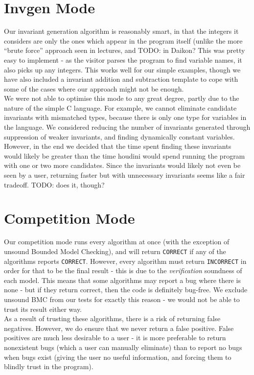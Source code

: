 \documentclass[11pt]{article}
\begin{document}
\section{Invgen Mode}

Our invariant generation algorithm is reasonably smart, in that the integers it considers are only the ones which appear in the program itself (unlike the more ``brute force'' approach seen in lectures, and TODO: in Daikon? This was pretty easy to implement - as the visitor parses the program to find variable names, it also picks up any integers. This works well for our simple examples, though we have also included a invariant addition and subtraction template to cope with some of the cases where our approach might not be enough. \\

We were not able to optimise this mode to any great degree, partly due to the nature of the simple C language. For example, we cannot eliminate candidate invariants with mismatched types, because there is only one type for variables in the language. We considered reducing the number of invariants generated through suppression of weaker invariants, and finding dynamically constant variables. However, in the end we decided that the time spent finding these invariants would likely be greater than the time houdini would spend running the program with one or two more candidates. Since the invariants would likely not even be seen by a user, returning faster but with unnecessary invariants seems like a fair tradeoff. TODO: does it, though? \\

\section{Competition Mode}

Our competition mode runs every algorithm at once (with the exception of unsound Bounded Model Checking), and will return \verb|CORRECT| if any of the algorithms reports \verb|CORRECT|. However, every algorithm must return \verb|INCORRECT| in order for that to be the final result - this is due to the \emph{verification} soundness of each model. This means that some algorithms may report a bug where there is none - but if they return correct, then the code is definitely bug-free. We exclude unsound BMC from our tests for exactly this reason - we would not be able to trust its result either way. \\

As a result of trusting these algorithms, there is a risk of returning false negatives. However, we do ensure that we never return a false positive. False positives are much less desirable to a user - it is more preferable to return nonexistent bugs (which a user can manually eliminate) than to report no bugs when bugs exist (giving the user no useful information, and forcing them to blindly trust in the program). \\
\end{document}
